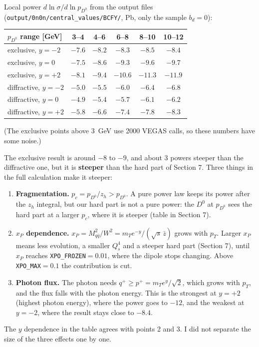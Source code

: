 \documentclass[12pt]{article}
\begin{document}
Local power $d\ln\sigma/d\ln p_{D^0}$ from the output files
(\texttt{output/0n0n/central\_values/BCFY/}, Pb, only the sample $b_d=0$):
\begin{center}
\begin{tabular}{lccccc}
\toprule
$p_{D^0}$ range [GeV] & 3--4 & 4--6 & 6--8 & 8--10 & 10--12 \\
\midrule
exclusive, $y=-2$ & $-7.6$ & $-8.2$ & $-8.3$ & $-8.5$ & $-8.4$ \\
exclusive, $y=0$  & $-7.5$ & $-8.6$ & $-9.3$ & $-9.6$ & $-9.7$ \\
exclusive, $y=+2$ & $-8.1$ & $-9.4$ & $-10.6$ & $-11.3$ & $-11.9$ \\
\midrule
diffractive, $y=-2$ & $-5.0$ & $-5.5$ & $-6.0$ & $-6.4$ & $-6.8$ \\
diffractive, $y=0$  & $-4.9$ & $-5.4$ & $-5.7$ & $-6.1$ & $-6.2$ \\
diffractive, $y=+2$ & $-5.8$ & $-6.6$ & $-7.4$ & $-7.8$ & $-8.3$ \\
\bottomrule
\end{tabular}
\end{center}
(The exclusive points above 3~GeV use 2000 VEGAS calls, so these numbers have some noise.)

The exclusive result is around $-8$ to $-9$, and about 3 powers steeper than the diffractive one, but
it is \textbf{steeper} than the hard part of Section 7. Three things in the full calculation make it steeper:
\begin{enumerate}
\item \textbf{Fragmentation.} $p_c=p_{D^0}/z_h>p_{D^0}$. A pure power law keeps its power after the
$z_h$ integral, but our hard part is not a pure power: the $D^0$ at $p_{D^0}$ sees the hard part at
a larger $p_c$, where it is steeper (table in Section 7).
\item \textbf{$x_P$ dependence.} $x_P=M_{q\bar q}^2/W^2 = m_T e^{-y}/(\sqrt{s}\,\bar z)$ grows with
$p_T$. Larger $x_P$ means less evolution, a smaller $Q_s^4$ and a steeper hard part (Section 7), until
$x_P$ reaches \texttt{XPO\_FROZEN}$=0.01$, where the dipole stops changing. Above
\texttt{XPO\_MAX}$=0.1$ the contribution is cut.
\item \textbf{Photon flux.} The photon needs $q^+\geq p^+=m_Te^{y}/\sqrt2$, which grows with $p_T$,
and the flux falls with the photon energy. This is the strongest at $y=+2$ (highest photon energy), where the
power goes to $-12$, and the weakest at $y=-2$, where the result stays close to $-8.4$.
\end{enumerate}
The $y$ dependence in the table agrees with points 2 and 3. I did not separate the size of the three
effects one by one.
\end{document}

